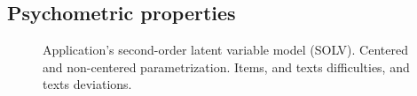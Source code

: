 
\subsection{Psychometric properties} \label{app_c5:psych}

%
\begin{figure}[H]
	\centering
	\begin{subfigure}
		\texttt{[image: SOLV\_recovery\_items]}
	\end{subfigure}
	\begin{subfigure}
		\texttt{[image: SOLV\_recovery\_texts]}
	\end{subfigure}
	\caption[Application's second-order latent variable model (SOLV). Centered and non-centered parametrization. Items, and texts difficulties, and texts deviations.]%
	{Application's second-order latent variable model (SOLV). Centered and non-centered parametrization. Items, and texts difficulties, and texts deviations.}
	\label{fig:SOLV_CE.NC_recovery}
\end{figure}
